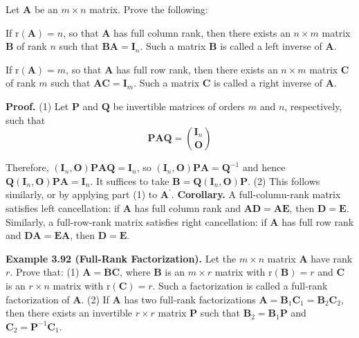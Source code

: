\documentclass[12pt, a4paper, oneside]{book}
\begin{document}
\begin{theorem}
    Let $\mathbf{A}$ be an $m \times n$ matrix. Prove the following:

    If $\mathrm{r}(\mathbf{A})=n$, so that $\mathbf{A}$ has full column rank, then there exists an $n \times m$ matrix $\mathbf{B}$ of rank $n$ such that ${\mathbf{B} \mathbf{A}}=\mathbf{I}_n$. Such a matrix $\mathbf{B}$ is called a left inverse of $\mathbf{A}$.

    If $\mathrm{r}(\mathbf{A})=m$, so that $\mathbf{A}$ has full row rank, then there exists an $n \times m$ matrix $\mathbf{C}$ of rank $m$ such that ${\mathbf{A} \mathbf{C}}=\mathbf{I}_m$. Such a matrix $\mathbf{C}$ is called a right inverse of $\mathbf{A}$.

    \textbf{Proof.} (1) Let $\mathbf{P}$ and $\mathbf{Q}$ be invertible matrices of orders $m$ and $n$, respectively, such that
    \begin{equation*}
        \mathbf{P} \mathbf{A} \mathbf{Q}=\binom{\mathbf{I}_n}{\mathbf{O}}
    \end{equation*}

    Therefore, $\left(\mathbf{I}_n, \mathbf{O}\right) \mathbf{P} \mathbf{A} \mathbf{Q}=\mathbf{I}_n$, so $\left(\mathbf{I}_n, \mathbf{O}\right) \mathbf{P} \mathbf{A}=\mathbf{Q}^{-1}$ and hence $\mathbf{Q}\left(\mathbf{I}_n, \mathbf{O}\right) \mathbf{P} \mathbf{A}=\mathbf{I}_n$. It suffices to take $\mathbf{B}=\mathbf{Q}\left(\mathbf{I}_n, \mathbf{O}\right) \mathbf{P}$.
    (2) This follows similarly, or by applying part (1) to $\mathbf{A}^{\prime}$.
    \textbf{Corollary.} A full-column-rank matrix satisfies left cancellation: if $\mathbf{A}$ has full column rank and ${\mathbf{A} \mathbf{D}}={\mathbf{A} \mathbf{E}}$, then $\mathbf{D}=\mathbf{E}$. Similarly, a full-row-rank matrix satisfies right cancellation: if $\mathbf{A}$ has full row rank and ${\mathbf{D} \mathbf{A}}={\mathbf{E} \mathbf{A}}$, then $\mathbf{D}=\mathbf{E}$.


\end{theorem}

\begin{theorem}
    \textbf{Example 3.92 (Full-Rank Factorization).} Let the $m \times n$ matrix $\mathbf{A}$ have rank $r$. Prove that:
    (1) $\mathbf{A}=\mathbf{B} \mathbf{C}$, where $\mathbf{B}$ is an $m \times r$ matrix with $\mathrm{r}(\mathbf{B})=r$ and $\mathbf{C}$ is an $r \times n$ matrix with $\mathrm{r}(\mathbf{C})=r$. Such a factorization is called a full-rank factorization of $\mathbf{A}$.
    (2) If $\mathbf{A}$ has two full-rank factorizations $\mathbf{A}=\mathbf{B}_1 \mathbf{C}_1=\mathbf{B}_2 \mathbf{C}_2$, then there exists an invertible $r \times r$ matrix $\mathbf{P}$ such that $\mathbf{B}_2=\mathbf{B}_1 \mathbf{P}$ and $\mathbf{C}_2=\mathbf{P}^{-1} \mathbf{C}_1$.
\end{theorem}
\end{document}
